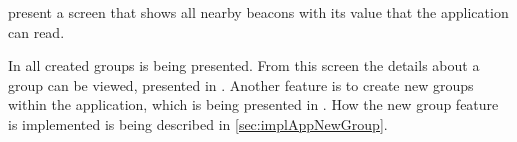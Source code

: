 \bigskip

 present a screen that shows all nearby beacons with its value that the application can read.

\bigskip

In  all created groups is being presented.
From this screen the details about a group can be viewed, presented in .
Another feature is to create new groups within the application, which is being presented in .
How the new group feature is implemented is being described in \cref{sec:implAppNewGroup}.
